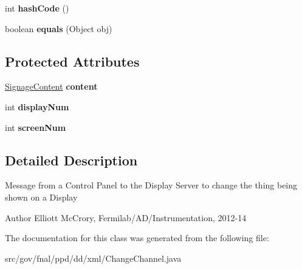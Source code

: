 \begin{DoxyCompactItemize}
\item 
\hypertarget{classgov_1_1fnal_1_1ppd_1_1dd_1_1xml_1_1ChangeChannel_a96c68a10edb22329ebfe139df50339a9}{int {\bfseries hash\-Code} ()}\label{classgov_1_1fnal_1_1ppd_1_1dd_1_1xml_1_1ChangeChannel_a96c68a10edb22329ebfe139df50339a9}

\item 
\hypertarget{classgov_1_1fnal_1_1ppd_1_1dd_1_1xml_1_1ChangeChannel_aa610dc9476174278978e3066acc2c902}{boolean {\bfseries equals} (Object obj)}\label{classgov_1_1fnal_1_1ppd_1_1dd_1_1xml_1_1ChangeChannel_aa610dc9476174278978e3066acc2c902}

\end{DoxyCompactItemize}
\subsection*{Protected Attributes}
\begin{DoxyCompactItemize}
\item 
\hypertarget{classgov_1_1fnal_1_1ppd_1_1dd_1_1xml_1_1ChangeChannel_a3357a30a43bafc16ca3d484f1a8a7801}{\hyperlink{interfacegov_1_1fnal_1_1ppd_1_1dd_1_1signage_1_1SignageContent}{Signage\-Content} {\bfseries content}}\label{classgov_1_1fnal_1_1ppd_1_1dd_1_1xml_1_1ChangeChannel_a3357a30a43bafc16ca3d484f1a8a7801}

\item 
\hypertarget{classgov_1_1fnal_1_1ppd_1_1dd_1_1xml_1_1ChangeChannel_a73b584e91eb081aa0e45bc0efa05ef84}{int {\bfseries display\-Num}}\label{classgov_1_1fnal_1_1ppd_1_1dd_1_1xml_1_1ChangeChannel_a73b584e91eb081aa0e45bc0efa05ef84}

\item 
\hypertarget{classgov_1_1fnal_1_1ppd_1_1dd_1_1xml_1_1ChangeChannel_a765f6f82d7f2468415ebbc4b621df191}{int {\bfseries screen\-Num}}\label{classgov_1_1fnal_1_1ppd_1_1dd_1_1xml_1_1ChangeChannel_a765f6f82d7f2468415ebbc4b621df191}

\end{DoxyCompactItemize}


\subsection{Detailed Description}
Message from a Control Panel to the Display Server to change the thing being shown on a Display

\begin{DoxyAuthor}{Author}
Elliott Mc\-Crory, Fermilab/\-A\-D/\-Instrumentation, 2012-\/14 
\end{DoxyAuthor}


The documentation for this class was generated from the following file\-:\begin{DoxyCompactItemize}
\item 
src/gov/fnal/ppd/dd/xml/Change\-Channel.\-java\end{DoxyCompactItemize}
